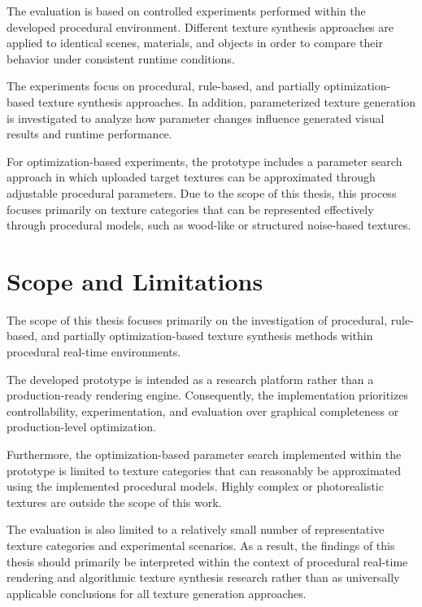 The evaluation is based on controlled experiments performed within the developed procedural environment. Different texture synthesis approaches are applied to identical scenes, materials, and objects in order to compare their behavior under consistent runtime conditions.

\clearpage
The experiments focus on procedural, rule-based, and partially optimization-based texture synthesis approaches. In addition, parameterized texture generation is investigated to analyze how parameter changes influence generated visual results and runtime performance.

For optimization-based experiments, the prototype includes a parameter search approach in which uploaded target textures can be approximated through adjustable procedural parameters. Due to the scope of this thesis, this process focuses primarily on texture categories that can be represented effectively through procedural models, such as wood-like or structured noise-based textures.

\section{Scope and Limitations}

The scope of this thesis focuses primarily on the investigation of procedural, rule-based, and partially optimization-based texture synthesis methods within procedural real-time environments.

The developed prototype is intended as a research platform rather than a production-ready rendering engine. Consequently, the implementation prioritizes controllability, experimentation, and evaluation over graphical completeness or production-level optimization.

Furthermore, the optimization-based parameter search implemented within the prototype is limited to texture categories that can reasonably be approximated using the implemented procedural models. Highly complex or photorealistic textures are outside the scope of this work.

The evaluation is also limited to a relatively small number of representative texture categories and experimental scenarios. As a result, the findings of this thesis should primarily be interpreted within the context of procedural real-time rendering and algorithmic texture synthesis research rather than as universally applicable conclusions for all texture generation approaches.